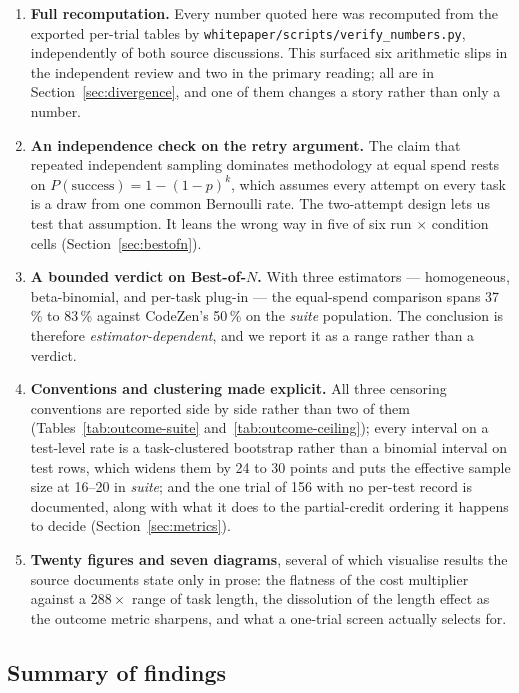 \documentclass[11pt,a4paper]{article}
\newcommand{\code}[1]{\texttt{\small #1}}
\begin{document}
\begin{enumerate}
\item \textbf{Full recomputation.} Every number quoted here was recomputed from the exported
      per-trial tables by \code{whitepaper/scripts/verify\_numbers.py}, independently of both
      source discussions. This surfaced six arithmetic slips in the independent review and two in
      the primary reading; all are in Section~\ref{sec:divergence}, and one of them changes a
      story rather than only a number.
\item \textbf{An independence check on the retry argument.} The claim that repeated
      independent sampling dominates methodology at equal spend rests on
      $P(\text{success}) = 1 - (1-p)^k$, which assumes every attempt on every task is a draw
      from one common Bernoulli rate. The two-attempt design lets us test that assumption.
      It leans the wrong way in five of six run $\times$ condition cells
      (Section~\ref{sec:bestofn}).
\item \textbf{A bounded verdict on Best-of-$N$.} With three estimators --- homogeneous,
      beta-binomial, and per-task plug-in --- the equal-spend comparison spans 37\,\% to
      83\,\% against CodeZen's 50\,\% on the \emph{suite} population. The conclusion is
      therefore \emph{estimator-dependent}, and we report it as a range rather than a verdict.
\item \textbf{Conventions and clustering made explicit.} All three censoring conventions are
      reported side by side rather than two of them (Tables~\ref{tab:outcome-suite}
      and~\ref{tab:outcome-ceiling}); every interval on a test-level rate is a task-clustered
      bootstrap rather than a binomial interval on test rows, which widens them by 24 to 30
      points and puts the effective sample size at 16--20 in \emph{suite}; and the one trial
      of 156 with no per-test record is documented, along with what it does to the
      partial-credit ordering it happens to decide (Section~\ref{sec:metrics}).
\item \textbf{Twenty figures and seven diagrams}, several of which visualise results the
      source documents state only in prose: the flatness of the cost multiplier against a
      $288\times$ range of task length, the dissolution of the length effect as the outcome
      metric sharpens, and what a one-trial screen actually selects for.
\end{enumerate}

\subsection{Summary of findings}
\end{document}
